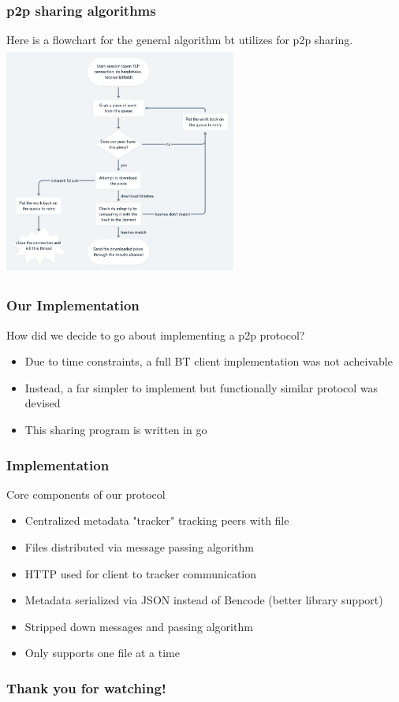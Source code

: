 \documentclass{beamer}
\begin{document}
\begin{frame}
\frametitle{p2p sharing algorithms}
\begin{block}{Here is a flowchart for the general algorithm bt utilizes for p2p sharing.}
\includegraphics[width=3in,height=3in]{bt_queue.png}
\end{block}
\end{frame}

\begin{frame}
\frametitle{Our Implementation}
\begin{block}{How did we decide to go about implementing a p2p protocol?}
\begin{itemize}
\item Due to time constraints, a full BT client implementation was not acheivable
\item Instead, a far simpler to implement but functionally similar protocol was devised
\item This sharing program is written in go
\end{itemize}
\end{block}
\end{frame}

\begin{frame}
\frametitle{Implementation}
\begin{block}{Core components of our protocol}
\begin{itemize}
\item Centralized metadata "tracker" tracking peers with file
\item Files distributed via message passing algorithm
\item HTTP used for client to tracker communication
\item Metadata serialized via JSON instead of Bencode (better library support)
\item Stripped down messages and passing algorithm
\item Only supports one file at a time
\end{itemize}
\end{block}
\end{frame}

\begin{frame}
\frametitle{Thank you for watching!}
\end{frame}
\end{document}
